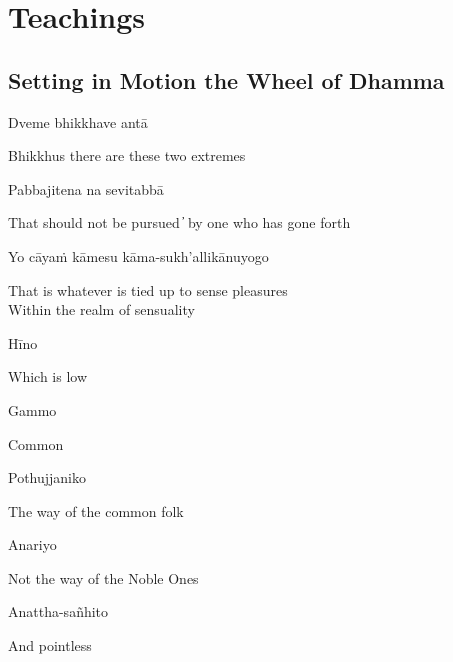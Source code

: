 \chapter{Teachings}

\section*{Setting in Motion the Wheel of Dhamma}

\begin{leader}
\end{leader}

Dveme bhikkhave antā

\begin{cprenglish}
Bhikkhus there are these two extremes
\end{cprenglish}

Pabbajitena na sevitabbā

\begin{cprenglish}
That should not be pursued  ̓  by one who has gone forth
\end{cprenglish}

Yo cāyaṁ kāmesu kāma-sukh’allikānuyogo

\begin{cprenglish}
That is whatever is tied up to sense pleasures\\
Within the realm of sensuality
\end{cprenglish}

Hīno

\begin{cprenglish}
Which is low
\end{cprenglish}

Gammo

\begin{cprenglish}
Common
\end{cprenglish}

Pothujjaniko

\begin{cprenglish}
The way of the common folk
\end{cprenglish}

Anariyo

\begin{cprenglish}
Not the way of the Noble Ones
\end{cprenglish}

Anattha-sañhito

\begin{cprenglish}
And pointless
\end{cprenglish}

